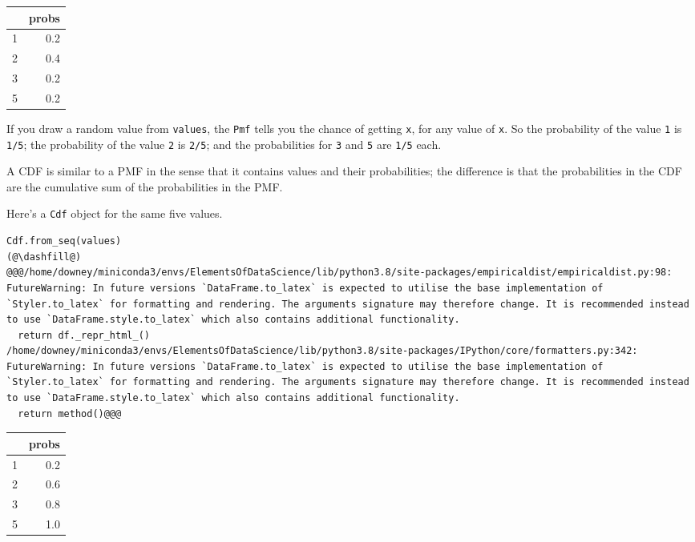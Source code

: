 \begin{tabular}{lr}
\midrule
{} &  probs \\
\midrule
1 &    0.2 \\
2 &    0.4 \\
3 &    0.2 \\
5 &    0.2 \\
\midrule
\end{tabular}

If you draw a random value from \passthrough{\lstinline!values!}, the
\passthrough{\lstinline!Pmf!} tells you the chance of getting
\passthrough{\lstinline!x!}, for any value of
\passthrough{\lstinline!x!}. So the probability of the value
\passthrough{\lstinline!1!} is \passthrough{\lstinline!1/5!}; the
probability of the value \passthrough{\lstinline!2!} is
\passthrough{\lstinline!2/5!}; and the probabilities for
\passthrough{\lstinline!3!} and \passthrough{\lstinline!5!} are
\passthrough{\lstinline!1/5!} each.

A CDF is similar to a PMF in the sense that it contains values and their
probabilities; the difference is that the probabilities in the CDF are
the cumulative sum of the probabilities in the PMF.

Here's a \passthrough{\lstinline!Cdf!} object for the same five values.

\begin{lstlisting}[]
Cdf.from_seq(values)
(@\dashfill@)
@@@/home/downey/miniconda3/envs/ElementsOfDataScience/lib/python3.8/site-packages/empiricaldist/empiricaldist.py:98: FutureWarning: In future versions `DataFrame.to_latex` is expected to utilise the base implementation of `Styler.to_latex` for formatting and rendering. The arguments signature may therefore change. It is recommended instead to use `DataFrame.style.to_latex` which also contains additional functionality.
  return df._repr_html_()
/home/downey/miniconda3/envs/ElementsOfDataScience/lib/python3.8/site-packages/IPython/core/formatters.py:342: FutureWarning: In future versions `DataFrame.to_latex` is expected to utilise the base implementation of `Styler.to_latex` for formatting and rendering. The arguments signature may therefore change. It is recommended instead to use `DataFrame.style.to_latex` which also contains additional functionality.
  return method()@@@
\end{lstlisting}

\begin{tabular}{lr}
\midrule
{} &  probs \\
\midrule
1 &    0.2 \\
2 &    0.6 \\
3 &    0.8 \\
5 &    1.0 \\
\midrule
\end{tabular}

